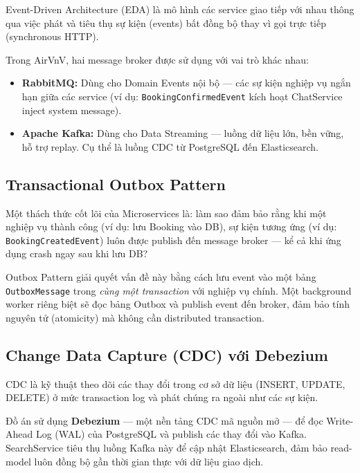 Event-Driven Architecture (EDA) là mô hình các service giao tiếp với nhau thông qua việc
phát và tiêu thụ sự kiện (events) bất đồng bộ thay vì gọi trực tiếp (synchronous HTTP).

Trong AirVnV, hai message broker được sử dụng với vai trò khác nhau:

\begin{itemize}
    \item \textbf{RabbitMQ:} Dùng cho Domain Events nội bộ — các sự kiện nghiệp vụ ngắn hạn
    giữa các service (ví dụ: \texttt{BookingConfirmedEvent} kích hoạt ChatService inject
    system message).

    \item \textbf{Apache Kafka:} Dùng cho Data Streaming — luồng dữ liệu lớn, bền vững, hỗ
    trợ replay. Cụ thể là luồng CDC từ PostgreSQL đến Elasticsearch.
\end{itemize}

\subsection{Transactional Outbox Pattern}
\label{subsec:outbox}

Một thách thức cốt lõi của Microservices là: làm sao đảm bảo rằng khi một nghiệp vụ thành công
(ví dụ: lưu Booking vào DB), sự kiện tương ứng (ví dụ: \texttt{BookingCreatedEvent}) luôn
được publish đến message broker — kể cả khi ứng dụng crash ngay sau khi lưu DB?

Outbox Pattern giải quyết vấn đề này bằng cách lưu event vào một bảng \texttt{OutboxMessage}
trong \textit{cùng một transaction} với nghiệp vụ chính. Một background worker riêng biệt
sẽ đọc bảng Outbox và publish event đến broker, đảm bảo tính nguyên tử (atomicity) mà không
cần distributed transaction.

\subsection{Change Data Capture (CDC) với Debezium}
\label{subsec:cdc}

CDC là kỹ thuật theo dõi các thay đổi trong cơ sở dữ liệu (INSERT, UPDATE, DELETE) ở
mức transaction log và phát chúng ra ngoài như các sự kiện.

Đồ án sử dụng \textbf{Debezium} — một nền tảng CDC mã nguồn mở — để đọc Write-Ahead Log (WAL)
của PostgreSQL và publish các thay đổi vào Kafka. SearchService tiêu thụ luồng Kafka này để
cập nhật Elasticsearch, đảm bảo read-model luôn đồng bộ gần thời gian thực với dữ liệu giao dịch.

